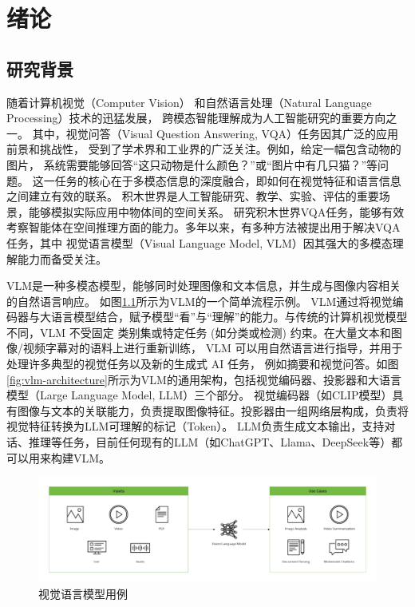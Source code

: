 \chapter{绪论}
\section{研究背景}
随着计算机视觉（Computer Vision）
和自然语言处理（Natural Language Processing）技术的迅猛发展，
跨模态智能理解成为人工智能研究的重要方向之一。
其中，视觉问答（Visual Question Answering, VQA）\cite{goyal2017making}任务因其广泛的应用前景和挑战性，
受到了学术界和工业界的广泛关注。例如，给定一幅包含动物的图片，
系统需要能够回答“这只动物是什么颜色？”或“图片中有几只猫？”等问题。
这一任务的核心在于多模态信息的深度融合，即如何在视觉特征和语言信息之间建立有效的联系。
积木世界\cite{hogg1983block}是人工智能研究、教学、实验、评估的重要场景，能够模拟实际应用中物体间的空间关系。
研究积木世界VQA任务，能够有效考察智能体在空间推理方面的能力。多年以来，有多种方法被提出用于解决VQA任务，其中
视觉语言模型（Visual Language Model, VLM）因其强大的多模态理解能力而备受关注。

VLM是一种多模态模型，能够同时处理图像和文本信息，并生成与图像内容相关的自然语言响应。
如图\ref{fig:vlm-example}所示为VLM的一个简单流程示例。
VLM通过将视觉编码器与大语言模型结合，赋予模型“看”与“理解”的能力。与传统的计算机视觉模型不同，VLM 不受固定
类别集或特定任务 (如分类或检测) 约束。在大量文本和图像/视频字幕对的语料上进行重新训练，
VLM 可以用自然语言进行指导，并用于处理许多典型的视觉任务以及新的生成式 AI 任务，
例如摘要和视觉问答。如图\ref{fig:vlm-architecture}所示为VLM的通用架构，包括视觉编码器、投影器和大语言模型（Large Language Model, LLM）三个部分。
视觉编码器（如CLIP模型）具有图像与文本的关联能力，负责提取图像特征。投影器由一组网络层构成，负责将视觉特征转换为LLM可理解的标记（Token）。
LLM负责生成文本输出，支持对话、推理等任务，目前任何现有的LLM（如ChatGPT、Llama、DeepSeek等）都可以用来构建VLM。
\begin{figure}
    \centering
    \includegraphics[width=\textwidth]{figures/VLM-example.png}
    \caption{视觉语言模型用例}
    \label{fig:vlm-example}
\end{figure}

